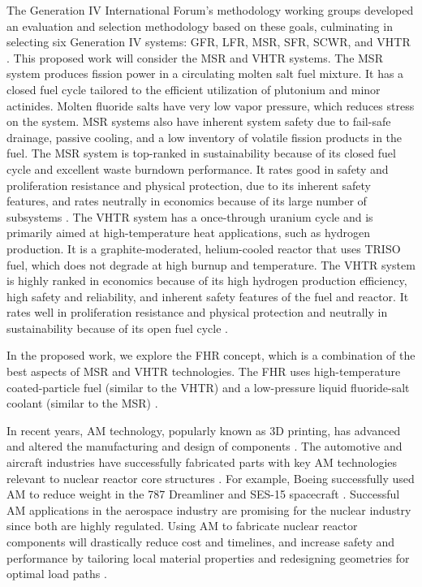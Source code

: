 The Generation IV International Forum's methodology working groups developed 
an evaluation and selection methodology based on these goals, 
culminating in selecting six Generation IV systems: \gls{GFR}, 
\gls{LFR}, \gls{MSR}, \gls{SFR}, \gls{SCWR}, and \gls{VHTR} 
\cite{gif_technology_2002}. 
This proposed work will consider the \gls{MSR} and \gls{VHTR} systems. 
The MSR system produces fission power in a circulating molten salt fuel mixture. 
It has a closed fuel cycle tailored to the efficient utilization of plutonium 
and minor actinides. 
Molten fluoride salts have very low vapor pressure, which reduces stress on the 
system. 
MSR systems also have inherent system safety due to fail-safe drainage, 
passive cooling, and a low inventory of volatile fission products in the fuel. 
The MSR system is top-ranked in sustainability because of its closed fuel cycle 
and excellent waste burndown performance. 
It rates good in safety and proliferation resistance and physical protection, 
due to its inherent safety features, and rates neutrally in economics because of
its large number of subsystems \cite{gif_technology_2002}.  
The \gls{VHTR} system has a once-through uranium cycle and is primarily aimed at 
high-temperature heat applications, such as hydrogen production. 
It is a graphite-moderated, helium-cooled reactor that uses \gls{TRISO} fuel, 
which does not degrade at high burnup and temperature.  
The \gls{VHTR} system is highly ranked in economics because of its high hydrogen 
production efficiency, high safety and reliability, and inherent safety features 
of the fuel and reactor. 
It rates well in proliferation resistance and physical protection and 
neutrally in sustainability because of its open fuel cycle \cite{gif_technology_2002}. 

In the proposed work, we explore the \gls{FHR} concept, which 
is a combination of the best aspects of \gls{MSR} and \gls{VHTR} technologies. 
The \gls{FHR} uses high-temperature coated-particle fuel (similar to the \gls{VHTR}) 
and a low-pressure liquid fluoride-salt coolant (similar to the \gls{MSR})
\cite{forsberg_fluoride-salt-cooled_2012,facilitators_fluoride-salt-cooled_2013}.

In recent years, \gls{AM} technology, popularly known as 3D printing, 
has advanced and altered the manufacturing and design of components 
\cite{simpson_considerations_2019}. 
The automotive and aircraft industries have successfully fabricated parts with 
key \gls{AM} technologies relevant to nuclear reactor core 
structures \cite{murr_frontiers_2016}.  
For example, Boeing successfully used \gls{AM} to reduce weight 
in the 787 Dreamliner \cite{noauthor_printed_2017} and SES-15 spacecraft 
\cite{noauthor_boeing_nodate}. 
Successful \gls{AM} applications in the aerospace industry are 
promising for the nuclear industry since both are highly regulated. 
Using \gls{AM} to fabricate nuclear reactor components will 
drastically reduce cost and timelines, and increase safety and performance by 
tailoring local material properties and redesigning geometries for optimal load paths 
\cite{simpson_considerations_2019}. 

